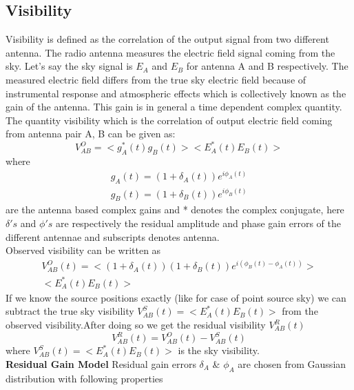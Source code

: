 \documentclass[fleqn,usenatbib]{mnras}
\begin{document}
\subsection{Visibility}
Visibility is defined as the correlation of the output signal from two different antenna. The radio antenna measures the electric field signal coming from the sky. Let's say the sky signal is $E_A$ and $E_B$ for antenna A and B respectively. The measured electric field differs from the true sky electric field because of instrumental response and atmospheric effects which is collectively known as the gain of the antenna. This gain is in general a time dependent complex quantity. The quantity visibility which is the correlation of output electric field coming from antenna pair A, B can be given as:
\begin{equation}
    V_{AB}^O = <g^*_A(t)g_B(t)> < E^*_A(t)E_B(t)>
\end{equation}
where 
\begin{equation}
    \begin{split}
     g_A(t) = (1+\delta_A(t))e^{i\phi_A(t)} \\ g_B(t) = (1+\delta_B(t))e^{i\phi_B(t)}   
    \end{split}
\end{equation}
 are the antenna based complex gains and * denotes the complex conjugate, here $\delta's$ and $\phi's$ are respectively the residual amplitude and phase gain errors of the different antennae and subscripts denotes antenna.\\
Observed visibility can be written as
\begin{equation}
\begin{split}
    V_{AB}^O(t) = <(1+\delta_A(t))(1+\delta_B(t))e^{i(\phi_B(t)-\phi_A(t))}> \\ < E^*_A(t)E_B(t)>
\end{split}
\end{equation}
If we know the source positions exactly (like for case of point source sky) we can subtract the true sky visibility $V_{AB}^S(t) = <E^*_A(t)E_B(t)> $ from the observed visibility.After doing so we get the residual visibility $V^R_{AB}(t)$
\begin{equation}
    V_{AB}^R (t)= V_{AB}^O(t) - V_{AB}^S(t)
\end{equation}
where $V_{AB}^S(t) =<E^*_A(t)E_B(t)> $ is the sky visibility.\\
\textbf{Residual Gain Model}
Residual gain errors $\delta_A$ \& $\phi_A$ are chosen from Gaussian distribution with following properties
\end{document}
